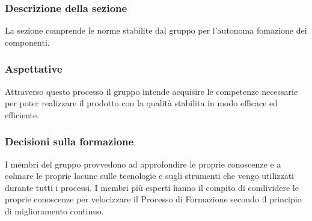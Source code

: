 \subsubsection{Descrizione della sezione}
La sezione comprende le norme stabilite dal gruppo per l'autonoma fomazione dei componenti.
\subsubsection{Aspettative}
Attraverso questo processo il gruppo intende acquisire le competenze necessarie per poter realizzare il prodotto con la qualità stabilita in modo efficace ed efficiente.
\subsubsection{Decisioni sulla formazione}\label{DecisioniFormazione}
I membri del gruppo provvedono ad approfondire le proprie conoscenze e a colmare le proprie lacune sulle tecnologie e sugli strumenti che vengo utilizzati durante tutti i processi. I membri più esperti hanno il compito di condividere le proprie conoscenze per velocizzare il Processo di Formazione secondo il principio di miglioramento continuo. 